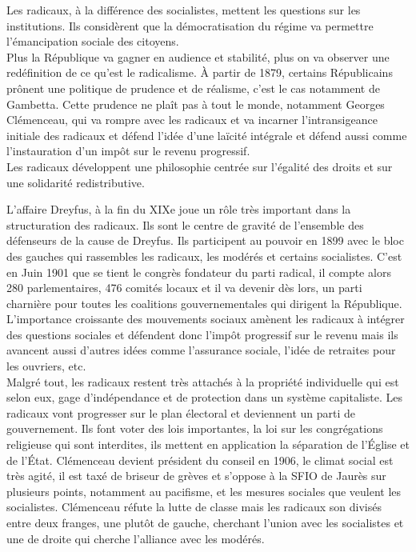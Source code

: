 \documentclass[10pt, a4paper, openany]{book}
\begin{document}
Les radicaux, à la différence des socialistes, mettent les questions sur les institutions. Ils considèrent que la démocratisation du régime va permettre l'émancipation sociale des citoyens. \\
Plus la République va gagner en audience et stabilité, plus on va observer une redéfinition de ce qu'est le radicalisme. À partir de 1879, certains Républicains prônent une politique de prudence et de réalisme, c'est le cas notamment de Gambetta. Cette prudence ne plaît pas à tout le monde, notamment Georges Clémenceau, qui va rompre avec les radicaux et va incarner l'intransigeance initiale des radicaux et défend l'idée d'une laïcité intégrale et défend aussi comme l'instauration d'un impôt sur le revenu progressif. \\
Les radicaux développent une philosophie centrée sur l'égalité des droits et sur une solidarité redistributive.


L'affaire Dreyfus, à la fin du XIXe joue un rôle très important dans la structuration des radicaux. Ils sont le centre de gravité de l'ensemble des défenseurs de la cause de Dreyfus. Ils participent au pouvoir en 1899 avec le bloc des gauches qui rassembles les radicaux, les modérés et certains socialistes. C'est en Juin 1901 que se tient le congrès fondateur du parti radical, il compte alors 280 parlementaires, 476 comités locaux et il va devenir dès lors, un parti charnière pour toutes les coalitions gouvernementales qui dirigent la République. \\
L'importance croissante des mouvements sociaux amènent les radicaux à intégrer des questions sociales et défendent donc l'impôt progressif sur le revenu mais ils avancent aussi d'autres idées comme l'assurance sociale, l'idée de retraites pour les ouvriers, etc. \\
Malgré tout, les radicaux restent très attachés à la propriété individuelle qui est selon eux, gage d'indépendance et de protection dans un système capitaliste. Les radicaux vont progresser sur le plan électoral et deviennent un parti de gouvernement. Ils font voter des lois importantes, la loi sur les congrégations religieuse qui sont interdites, ils mettent en application la séparation de l'Église et de l'État. Clémenceau devient président du conseil en 1906, le climat social est très agité, il est taxé de briseur de grèves et s'oppose à la SFIO de Jaurès sur plusieurs points, notamment au pacifisme, et les mesures sociales que veulent les socialistes. Clémenceau réfute la lutte de classe mais les radicaux son divisés entre deux franges, une plutôt de gauche, cherchant l'union avec les socialistes et une de droite qui cherche l'alliance avec les modérés. 
\end{document}
